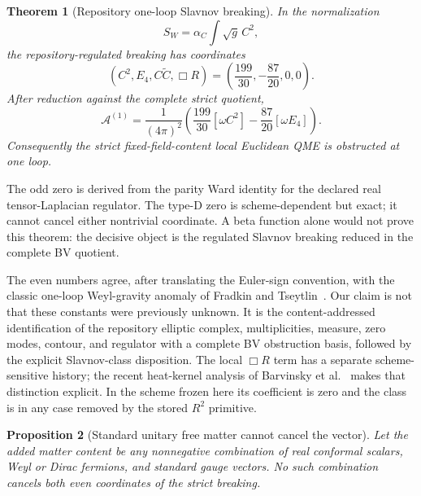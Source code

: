 \documentclass[11pt]{article}
\newtheorem{theorem}{Theorem}[section]
\newtheorem{proposition}[theorem]{Proposition}
\theoremstyle{definition}
\theoremstyle{remark}
\newcommand{\cA}{\mathcal A}
\begin{document}
\begin{theorem}[Repository one-loop Slavnov breaking]
In the normalization
\[
 S_W=\alpha_C\int\sqrt g\,C^2,
\]
the repository-regulated breaking has coordinates
\[
 (C^2,E_4,C\widetilde C,\Box R)
 =\left(\frac{199}{30},-\frac{87}{20},0,0\right).
\]
After reduction against the complete strict quotient,
\[
 \cA^{(1)}=\frac{1}{(4\pi)^2}
 \left(\frac{199}{30}[\omega C^2]-\frac{87}{20}[\omega E_4]\right).
\]
Consequently the strict fixed-field-content local Euclidean QME is obstructed
at one loop.
\end{theorem}

The odd zero is derived from the parity Ward identity for the declared real
tensor-Laplacian regulator.  The type-D zero is scheme-dependent but exact;
it cannot cancel either nontrivial coordinate.  A beta function alone would
not prove this theorem: the decisive object is the regulated Slavnov breaking
reduced in the complete BV quotient.

The even numbers agree, after translating the Euler-sign convention, with
the classic one-loop Weyl-gravity anomaly of Fradkin and
Tseytlin~\cite{FradkinTseytlin}.  Our claim is not that these constants were
previously unknown.  It is the content-addressed identification of the
repository elliptic complex, multiplicities, measure, zero modes, contour,
and regulator with a complete BV obstruction basis, followed by the explicit
Slavnov-class disposition.  The local $\Box R$ term has a separate
scheme-sensitive history; the recent heat-kernel analysis of
Barvinsky et al.~\cite{BarvinskyLocal} makes that distinction explicit.  In
the scheme frozen here its coefficient is zero and the class is in any case
removed by the stored $R^2$ primitive.

\begin{proposition}[Standard unitary free matter cannot cancel the vector]
Let the added matter content be any nonnegative combination of real conformal
scalars, Weyl or Dirac fermions, and standard gauge vectors.  No such
combination cancels both even coordinates of the strict breaking.
\end{proposition}
\end{document}
